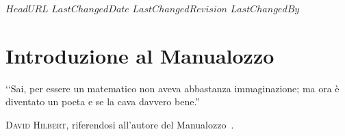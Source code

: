 \svnidlong
{$HeadURL$}
{$LastChangedDate$}
{$LastChangedRevision$}
{$LastChangedBy$}

\chapter*{Introduzione al Manualozzo\texttrademark\ }

\begin{introduction}
‘‘Sai, per essere un matematico non aveva abbastanza immaginazione; ma ora è diventato un poeta e se la cava davvero bene.''
\begin{flushright}
	\textsc{David Hilbert,} riferendosi  all'autore del Manualozzo\texttrademark\ .
\end{flushright}
\end{introduction}

